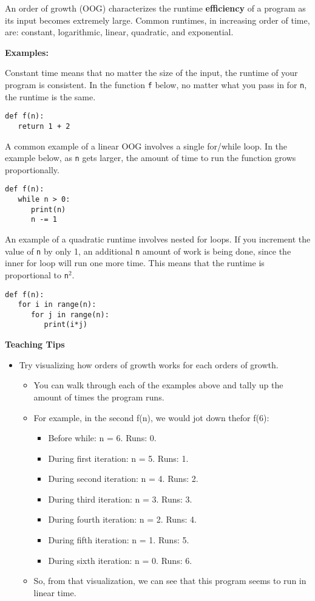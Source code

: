 An order of growth (OOG) characterizes the runtime \textbf{efficiency} of a program as its input becomes extremely large. Common runtimes, in increasing order of time, are: constant, logarithmic, linear, quadratic, and exponential.

\textbf{Examples:}

Constant time means that no matter the size of the input, the runtime of your program is consistent. In the function \lstinline{f} below, no matter what you pass in for \lstinline{n}, the runtime is the same. \\
\begin{lstlisting}
def f(n):
   return 1 + 2
\end{lstlisting}
A common example of a linear OOG involves a single for/while loop. In the example below, as \lstinline{n} gets larger, the amount of time to run the function grows proportionally. \\
\begin{lstlisting}
def f(n):
   while n > 0:
      print(n)
      n -= 1
\end{lstlisting}
An example of a quadratic runtime involves nested for loops. If you increment the value of \lstinline{n} by only 1, an additional \lstinline{n} amount of work is being done, since the inner for loop will run one more time. This means that the runtime is proportional to \lstinline{n}$^{2}$. \\
\begin{lstlisting}
def f(n):
   for i in range(n):
      for j in range(n):
         print(i*j)
\end{lstlisting}

\begin{guide}
   \textbf{Teaching Tips}
   \begin{itemize}
      \item Try visualizing how orders of growth works for each orders of growth.
      \begin{itemize}
      \item You can walk through each of the examples above and tally up the amount of times the program runs. 
      \item For example, in the second f(n), we would jot down thefor f(6):
      \begin{itemize}
         \item Before while: n = 6. Runs: 0.
         \item During first iteration: n = 5. Runs: 1.
         \item During second iteration: n = 4. Runs: 2.
         \item During third iteration: n = 3. Runs: 3.
         \item During fourth iteration: n = 2. Runs: 4.
         \item During fifth iteration: n = 1. Runs: 5.
         \item During sixth iteration: n = 0. Runs: 6.
      \end{itemize}
      \item So, from that visualization, we can see that this program seems to run in linear time. 
      \end{itemize}
   \end{itemize}
\end{guide}